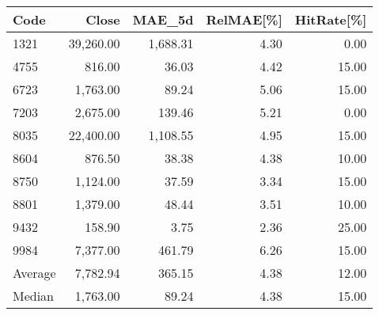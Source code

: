 \begingroup
\footnotesize
\begin{tabular}{lrrrr}
\hline
Code & Close & MAE\_5d & RelMAE[\%] & HitRate[\%] \\
\hline
1321 & 39,260.00 & 1,688.31 & 4.30 & 0.00 \\
4755 & 816.00 & 36.03 & 4.42 & 15.00 \\
6723 & 1,763.00 & 89.24 & 5.06 & 15.00 \\
7203 & 2,675.00 & 139.46 & 5.21 & 0.00 \\
8035 & 22,400.00 & 1,108.55 & 4.95 & 15.00 \\
8604 & 876.50 & 38.38 & 4.38 & 10.00 \\
8750 & 1,124.00 & 37.59 & 3.34 & 15.00 \\
8801 & 1,379.00 & 48.44 & 3.51 & 10.00 \\
9432 & 158.90 & 3.75 & 2.36 & 25.00 \\
9984 & 7,377.00 & 461.79 & 6.26 & 15.00 \\
Average & 7,782.94 & 365.15 & 4.38 & 12.00 \\
Median & 1,763.00 & 89.24 & 4.38 & 15.00 \\
\hline
\end{tabular}
\endgroup
